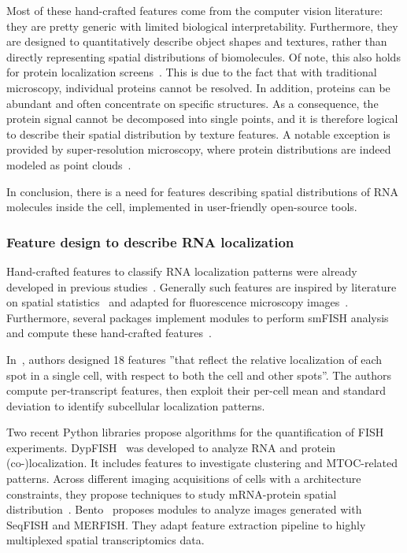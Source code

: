 Most of these hand-crafted features come from the computer vision literature: they are pretty generic with limited biological interpretability.
Furthermore, they are designed to quantitatively describe object shapes and textures, rather than directly representing spatial distributions of biomolecules.
Of note, this also holds for protein localization screens~\cite{Glory2007, ouyang_analysis_2019}.
This is due to the fact that with traditional microscopy, individual proteins cannot be resolved.
In addition, proteins can be abundant and often concentrate on specific structures.
As a consequence, the protein signal cannot be decomposed into single points, and it is therefore logical to describe their spatial distribution by texture features.
A notable exception is provided by super-resolution microscopy, where protein distributions are indeed modeled as point clouds~\cite{Levet2019}.

In conclusion, there is a need for features describing spatial distributions of \ac{RNA} molecules inside the cell, implemented in user-friendly open-source tools.

\subsubsection{Feature design to describe RNA localization}

Hand-crafted features to classify \ac{RNA} localization patterns were already developed in previous studies~\cite{battich_image-based_2013,samacoits_computational_2018}.
Generally such features are inspired by literature on spatial statistics~\cite{ripley2005spatial} and adapted for fluorescence microscopy images~\cite{lagache_statistical_2015,stueland_rdi_2019}.
Furthermore, several packages implement modules to perform \ac{smFISH} analysis and compute these hand-crafted features~\cite{mueller_fish-quant_2013,savulescu_dypfish_2019,mah_bento_2022}.

In~\cite{battich_image-based_2013}, authors designed 18 features ''that reflect the relative localization of each spot in a single cell, with respect to both the cell and other spots''.
The authors compute per-transcript features, then exploit their per-cell mean and standard deviation to identify subcellular localization patterns.

Two recent Python libraries propose algorithms for the quantification of \ac{FISH} experiments.
DypFISH~\cite{savulescu_dypfish_2019} was developed to analyze \ac{RNA} and protein (co-)localization.
It includes features to investigate clustering and \ac{MTOC}-related patterns.
Across different imaging acquisitions of cells with a architecture constraints, they propose techniques to study \ac{mRNA}-protein spatial distribution~\cite{savulescu_interrogating_2021}.
Bento~\cite{mah_bento_2022} proposes modules to analyze images generated with \ac{SeqFISH} and \ac{MERFISH}.
They adapt feature extraction pipeline to highly multiplexed spatial transcriptomics data.

